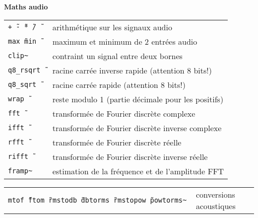 \documentclass[a4paper, landscape, 10pt]{article}
\newcommand{\refcardtitle}[1]{
  \begin{center}
    \textbf{\small{#1}} %
  \end{center}
}
\begin{document}
\begin{multicols}{3}
  \refcardtitle{Maths audio}
  \begin{tabularx}{9cm}{>{\tt}l X}
    +\~\ -\~\ *\~\ /\~\ & arithmétique sur les signaux audio \\
    max\~\ min\~\ & maximum et minimum de 2 entrées audio \\
    clip\~ & contraint un signal entre deux bornes \\
    q8\_rsqrt\~\ & racine carrée inverse rapide (attention 8 bits!) \\
    q8\_sqrt\~\ & racine carrée rapide (attention 8 bits!) \\
    wrap\~\ & reste modulo 1 (partie décimale pour les positifs) \\
    fft\~\ & transformée de Fourier discrète complexe \\
    ifft\~\ & transformée de Fourier discrète inverse complexe \\
    rfft\~\ & transformée de Fourier discrète réelle \\
    rifft\~\ & transformée de Fourier discrète inverse réelle \\
    framp\~ & estimation de la fréquence et de l'amplitude FFT \\
  \end{tabularx}
  \begin{tabularx}{9cm}{>{\tt}X l}
    mtof\~\ ftom\~\ rmstodb\~\ dbtorms\~\ rmstopow\~\ powtorms\~ & conversions acoustiques \\
  \end{tabularx}


\end{multicols}
\end{document}

